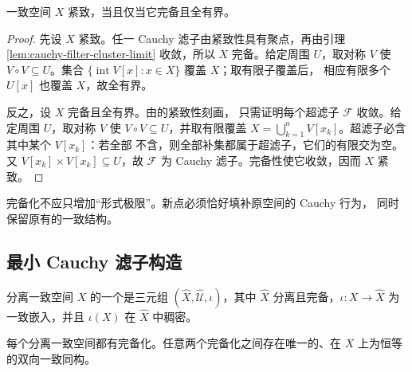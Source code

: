 \begin{theorem}[紧致性的一致刻画]
\label{thm:compact-complete-totally-bounded-uniform}
一致空间 \(X\) 紧致，当且仅当它完备且全有界。
\end{theorem}

\begin{proof}
先设 \(X\) 紧致。任一 Cauchy 滤子由紧致性具有聚点，再由引理
\ref{lem:cauchy-filter-cluster-limit} 收敛，所以 \(X\) 完备。给定周围
\(U\)，取对称 \(V\) 使 \(V\circ V\subseteq U\)。集合
\(\{\operatorname{int}V[x]:x\in X\}\) 覆盖 \(X\)；取有限子覆盖后，
相应有限多个 \(U[x]\) 也覆盖 \(X\)，故全有界。

反之，设 \(X\) 完备且全有界。由的紧致性刻画，
只需证明每个超滤子
\(\mathcal F\) 收敛。给定周围 \(U\)，取对称 \(V\) 使
\(V\circ V\subseteq U\)，并取有限覆盖
\(X=\bigcup_{k=1}^nV[x_k]\)。超滤子必含其中某个 \(V[x_k]\)：若全部
不含，则全部补集都属于超滤子，它们的有限交为空。又
\(V[x_k]\times V[x_k]\subseteq U\)，故 \(\mathcal F\) 为 Cauchy
滤子。完备性使它收敛，因而 \(X\) 紧致。
\end{proof}

完备化不应只增加“形式极限”。新点必须恰好填补原空间的 Cauchy 行为，
同时保留原有的一致结构。

\subsection{最小 Cauchy 滤子构造}

\begin{definition}[一致完备化]
分离一致空间 \(X\) 的一个是三元组
\((\widehat X,\widehat{\mathcal U},\iota)\)，其中 \(\widehat X\)
分离且完备，\(\iota:X\to\widehat X\) 为一致嵌入，并且
\(\iota(X)\) 在 \(\widehat X\) 中稠密。
\end{definition}

\begin{theorem}[一致空间的完备化]
\label{thm:uniform-completion}
每个分离一致空间都有完备化。任意两个完备化之间存在唯一的、在 \(X\)
上为恒等的双向一致同构。
\end{theorem}

